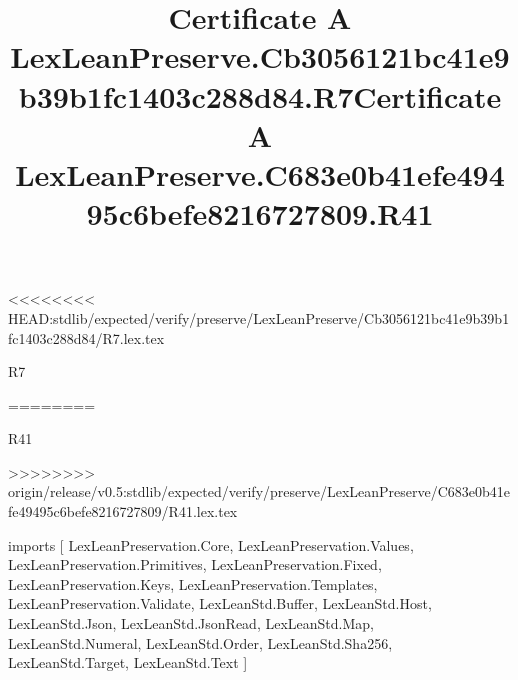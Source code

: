 <<<<<<<< HEAD:stdlib/expected/verify/preserve/LexLeanPreserve/Cb3056121bc41e9b39b1fc1403c288d84/R7.lex.tex
\begin{lexlean}{R7}
\title{Certificate A LexLeanPreserve.Cb3056121bc41e9b39b1fc1403c288d84.R7}
========
\begin{lexlean}{R41}
\title{Certificate A LexLeanPreserve.C683e0b41efe49495c6befe8216727809.R41}
>>>>>>>> origin/release/v0.5:stdlib/expected/verify/preserve/LexLeanPreserve/C683e0b41efe49495c6befe8216727809/R41.lex.tex
\begin{coremodule}
imports [
  LexLeanPreservation.Core,
  LexLeanPreservation.Values,
  LexLeanPreservation.Primitives,
  LexLeanPreservation.Fixed,
  LexLeanPreservation.Keys,
  LexLeanPreservation.Templates,
  LexLeanPreservation.Validate,
  LexLeanStd.Buffer,
  LexLeanStd.Host,
  LexLeanStd.Json,
  LexLeanStd.JsonRead,
  LexLeanStd.Map,
  LexLeanStd.Numeral,
  LexLeanStd.Order,
  LexLeanStd.Sha256,
  LexLeanStd.Target,
  LexLeanStd.Text
]


\end{coremodule}
\end{lexlean}
\end{lexlean}
